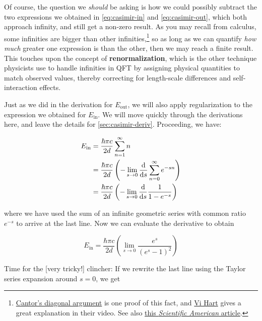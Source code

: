 Of course, the question we \emph{should} be asking is how we could possibly subtract the two expressions we obtained in \autoref{eq:casimir-in} and \ref{eq:casimir-out}, which both approach infinity, and still get a non-zero result. 
As you may recall from calculus, some infinities are bigger than other infinities,\footnote{\href{https://en.wikipedia.org/wiki/Cantor\%27s_diagonal_argument}{Cantor's diagonal argument} is one proof of this fact, and \href{https://www.khanacademy.org/math/math-for-fun-and-glory/vi-hart/infinity/v/proof-infinities}{Vi Hart} gives a great explanation in their video.
See also \href{https://www.scientificamerican.com/article/a-deep-math-dive-into-why-some-infinities-are-bigger-than-others/}{this \emph{Scientific American} article}.} so as long as we can quantify \emph{how much} greater one expression is than the other, then we may reach a finite result. 
This touches upon the concept of \textbf{renormalization}, which is the other technique physicists use to handle infinities in QFT by assigning physical quantities to match observed values, thereby correcting for length-scale differences and self-interaction effects. 

Just as we did in the derivation for $E_{\text{out}}$, we will also apply regularization to the expression we obtained for $E_{\text{in}}$. 
We will move quickly through the derivations here, and leave the details for \autoref{sec:casimir-deriv}. 
Proceeding, we have:

\begin{align*}
	E_{\text{in}} &= \frac{\hbar \pi c}{2d} \sum_{n=1}^{\infty} n \\
	&= \frac{\hbar \pi c}{2d} \left( - \lim\limits_{s \rightarrow 0} \dv{s} \sum_{n=0}^{\infty} e^{-sn} \right) \\
	&= \frac{\hbar \pi c}{2d} \left( - \lim\limits_{s \rightarrow 0} \dv{s} \frac{1}{1-e^{-s}} \right)
\end{align*}

\noindent where we have used the sum of an infinite geometric series with common ratio $e^{-s}$ to arrive at the last line. 
Now we can evaluate the derivative to obtain

\begin{equation*}
	E_{\text{in}} = \frac{\hbar \pi c}{2d} \left( \lim\limits_{s \rightarrow 0} \frac{e^{s}}{(e^s-1)^2} \right)
\end{equation*}

Time for the [very tricky!] clincher: If we rewrite the last line using the Taylor series expansion around $s = 0$, we get

